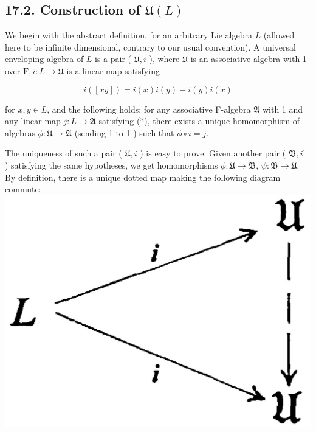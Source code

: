 \documentclass[10pt]{article}
\begin{document}
\subsection*{17.2. Construction of $\mathfrak{U}(L)$}
We begin with the abstract definition, for an arbitrary Lie algebra $L$ (allowed here to be infinite dimensional, contrary to our usual convention). A universal enveloping algebra of $L$ is a pair ( $\mathfrak{U}, i$ ), where $\mathfrak{U}$ is an associative algebra with 1 over $\mathrm{F}, i: L \rightarrow \mathfrak{U}$ is a linear map satisfying


\begin{equation*}
i([x y])=i(x) i(y)-i(y) i(x) \tag{*}
\end{equation*}


for $x, y \in L$, and the following holds: for any associative F-algebra $\mathfrak{A}$ with 1 and any linear map $j: L \rightarrow \mathfrak{A}$ satisfying (*), there exists a unique homomorphism of algebras $\phi: \mathfrak{U} \rightarrow \mathfrak{A}$ (sending 1 to 1 ) such that $\phi \circ i=j$.

The uniqueness of such a pair ( $\mathfrak{U}, i$ ) is easy to prove. Given another pair ( $\mathfrak{B}, i^{\prime}$ ) satisfying the same hypotheses, we get homomorphisms $\phi: \mathfrak{U} \rightarrow \mathfrak{B}$, $\psi: \mathfrak{B} \rightarrow \mathfrak{U}$. By definition, there is a unique dotted map making the following diagram commute:\\
\includegraphics[max width=\textwidth, center]{2025_06_06_fac2836a92464059da43g-103}
\end{document}
